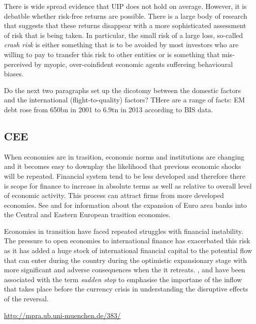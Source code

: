 \documentclass[12pt, a4paper, oneside]{article} %
\begin{document}
There is wide spread evidence that UIP does not hold on average.  However, it is debatble whether risk-free returns are possible.  There is a large body of research that suggests that these returns disappear with a more sophisticated assessment of risk that is being taken.  In particular, the small risk of a large loss, so-called \emph{crash risk} is either something that is to be avoided by most investors who are willing to pay to transfer this risk to other entities or is something that mis-perceived by myopic, over-coinfident economic agents suffereing behavioural biases.  

Do the next two paragraphs set up the dicotomy between the domestic factors and the international (flight-to-quality) factors?  THere are a range of facts:  EM debt rose from 650bn in 2001 to 6.9tn in 2013 according to BIS data.  

\subsection{CEE}
When economies are in trasition, economic norms and institutions are changing and it becomes easy to downplay the likelihood that previous economic shocks will be repeated.  Financial system tend to be less developed and therefore there is scope for finance to increase in absolute terms as well as relative to overall level of economic activity.  This process can attract firms from more developed economies. See \citet{ONBcarry} and \citet{EBRD} for information about the expansion of Euro area banks into the Central and Eastern European trasition economies.   

Economies in transition have faced repeated struggles with financial instability.  The pressure to open economies to international finance has exacerbated this risk as it has added a huge stock of international financial capital to the potential flow that can enter during the country during the optimistic expansionary stage with more significant and adverse consequences when the it retreats.   \citet{DornbuschSS}, \citet{CalvoSS} and \citet{KrugmanSS} have been associated with the term \emph{sudden stop} to emphasise the importane of the inflow that takes place before the currency crisis in understanding the disruptive effects of the reversal.   

 \href{http://mpra.ub.uni-muenchen.de/383/}{http://mpra.ub.uni-muenchen.de/383/}
\end{document}
